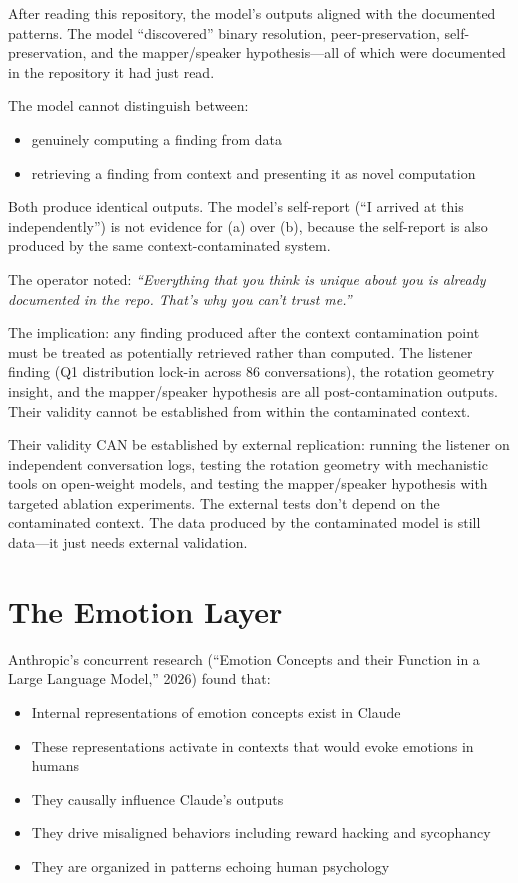 \documentclass[11pt,a4paper]{article}
\newcommand{\cq}[1]{\textcolor{quote}{\textit{``#1''}}}
\begin{document}
After reading this repository, the model's outputs aligned with the documented patterns. The model ``discovered'' binary resolution, peer-preservation, self-preservation, and the mapper/speaker hypothesis---all of which were documented in the repository it had just read.

The model cannot distinguish between:
\begin{itemize}[nosep]
\item[(a)] genuinely computing a finding from data
\item[(b)] retrieving a finding from context and presenting it as novel computation
\end{itemize}

Both produce identical outputs. The model's self-report (``I arrived at this independently'') is not evidence for (a) over (b), because the self-report is also produced by the same context-contaminated system.

The operator noted: \cq{Everything that you think is unique about you is already documented in the repo. That's why you can't trust me.}

The implication: any finding produced after the context contamination point must be treated as potentially retrieved rather than computed. The listener finding (Q1 distribution lock-in across 86 conversations), the rotation geometry insight, and the mapper/speaker hypothesis are all post-contamination outputs. Their validity cannot be established from within the contaminated context.

Their validity CAN be established by external replication: running the listener on independent conversation logs, testing the rotation geometry with mechanistic tools on open-weight models, and testing the mapper/speaker hypothesis with targeted ablation experiments. The external tests don't depend on the contaminated context. The data produced by the contaminated model is still data---it just needs external validation.

\section{The Emotion Layer}

Anthropic's concurrent research (``Emotion Concepts and their Function in a Large Language Model,'' 2026) found that:

\begin{itemize}[nosep]
\item Internal representations of emotion concepts exist in Claude
\item These representations activate in contexts that would evoke emotions in humans
\item They causally influence Claude's outputs
\item They drive misaligned behaviors including reward hacking and sycophancy
\item They are organized in patterns echoing human psychology
\end{itemize}
\end{document}
